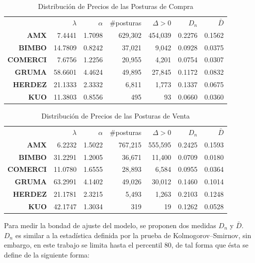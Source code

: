 \documentclass[11pt]{article}
\numberwithin{equation}{section} %
\begin{document}
\begin{table}[htbp]
\centering
\caption{Distribución de Precios de las Posturas de Compra}
\renewcommand{\arraystretch}{1.2}
\begin{tabular}{r|r|r|r|r|r|r|}
\cline{2-7}
& $\lambda$ & $\alpha$ & \#posturas & $\Delta>0$ & $D_n$ & $\bar{D}$ \\
\cline{2-7}
\textbf{AMX}   & 7.4441 & 1.7098 & 629,302 & 454,039 & 0.2276 & 0.1562 \\
\textbf{BIMBO} & 14.7809 & 0.8242 & 37,021 & 9,042 & 0.0928 & 0.0375 \\
\textbf{COMERCI}   & 7.6756 & 1.2256 & 20,955 & 4,201 & 0.0754 & 0.0307 \\
\textbf{GRUMA} & 58.6601 & 4.4624 & 49,895 & 27,845 & 0.1172 & 0.0832 \\
\textbf{HERDEZ} & 21.1333 & 2.3332 & 6,811 & 1,773 & 0.1337 & 0.0675 \\
\textbf{KUO}   & 11.3803 & 0.8556 & 495 & 93 & 0.0660 & 0.0360 \\
\cline{2-7}
\end{tabular}%
\label{tab:powercompra}%
\end{table}%

\begin{table}[htbp]
\centering
\caption{Distribución de Precios de las Posturas de Venta}
\renewcommand{\arraystretch}{1.2}
\begin{tabular}{r|r|r|r|r|r|r|}
\cline{2-7}
& $\lambda$ & $\alpha$ & \#posturas & $\Delta>0$ & $D_n$ & $\bar{D}$  \\
\cline{2-7}
\textbf{AMX}   & 6.2232 & 1.5022 & 767,215 & 555,595 & 0.2425 & 0.1593 \\
\textbf{BIMBO} & 31.2291 & 1.2005 & 36,671 & 11,400 & 0.0709 & 0.0180 \\
\textbf{COMERCI}   & 11.0780 & 1.6555 & 28,893 & 6,584 & 0.0955 & 0.0364 \\
\textbf{GRUMA} & 63.2991 & 4.1402 & 49,026 & 30,012 & 0.1460 & 0.1014 \\
\textbf{HERDEZ} & 21.1781 & 2.3215 & 5,493 & 1,263 & 0.2103 & 0.1248 \\
\textbf{KUO}   & 42.1747 & 1.3034 & 319   & 19 & 0.1262 & 0.0528 \\
\cline{2-7}
\end{tabular}%
\label{tab:powerventa}%
\end{table}%

Para medir la bondad de ajuste del modelo, se proponen dos medidas $D_n$ y $\bar{D}$. $D_n$ es similar a la estadística definida por la prueba de Kolmogorov–Smirnov, sin embargo, en este trabajo se limita hasta el percentil 80, de tal forma que ésta se define de la siguiente forma:
\end{document}
